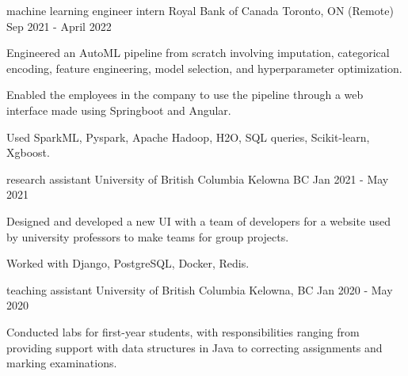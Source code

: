 

\begin{cventries}

  \cventry
    {machine learning engineer intern} %
    {Royal Bank of Canada} %
    {Toronto, ON (Remote)} %
    {Sep 2021 - April 2022} %
    {
      \begin{cvitems} %
        \item {Engineered an AutoML pipeline from scratch involving imputation, categorical encoding, feature engineering, model selection, and hyperparameter optimization.} 
        \item {Enabled the employees in the company to use the pipeline through a web interface made using Springboot and Angular.}
        \item {Used SparkML, Pyspark, Apache Hadoop, H2O, SQL queries, Scikit-learn, Xgboost.}
      \end{cvitems}
    }

\vspace{-1.0mm}


  \cventry
    {research assistant} %
    {University of British Columbia} %
    {Kelowna BC} %
    {Jan 2021 - May 2021} %
    {
      \begin{cvitems} %
        \item {Designed and developed a new UI with a team of developers for a website used by university professors to make teams for group projects.} 
        \item {Worked with Django, PostgreSQL, Docker, Redis.}
      \end{cvitems}
    }


\vspace{-1.0mm}
  \cventry
    {teaching assistant} %
    {University of British Columbia} %
    {Kelowna, BC} %
    {Jan 2020 - May 2020} %
    {
      \begin{cvitems} %
        \item {Conducted labs for first-year students, with responsibilities ranging from providing support with data structures in Java to correcting assignments and marking examinations.}
      \end{cvitems}
    }


\end{cventries}
